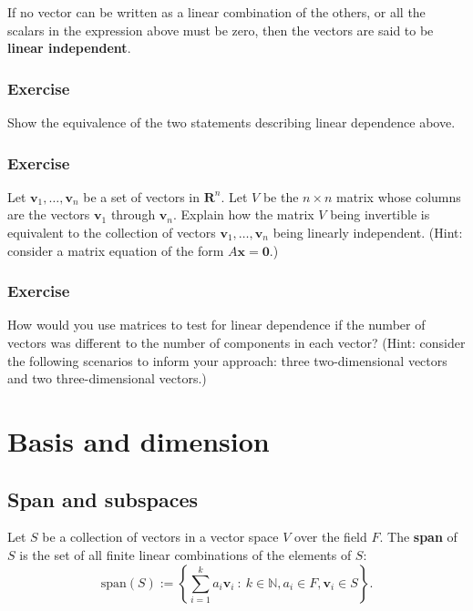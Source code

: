 \documentclass[a4paper,12pt]{amsart}
\begin{document}
    If no vector can be written as a linear combination of the others, or all the scalars in the expression above must be zero, then the vectors are said to be \textbf{linear independent}.

    \subsubsection{Exercise} Show the equivalence of the two statements describing linear dependence above.

    \subsubsection{Exercise} Let $\mathbf{v}_1, \ldots, \mathbf{v}_n$ be a set of vectors in $\mathbf{R}^n$. Let $V$ be the $n \times n$ matrix whose columns are the vectors $\mathbf{v}_1$ through $\mathbf{v}_n$. Explain how the matrix $V$ being invertible is equivalent to the collection of vectors $\mathbf{v}_1, \ldots, \mathbf{v}_n$ being linearly independent. (Hint: consider a matrix equation of the form $A\mathbf{x} = \mathbf{0}$.)

    \subsubsection{Exercise} How would you use matrices to test for linear dependence if the number of vectors was different to the number of components in each vector? (Hint: consider the following scenarios to inform your approach: three two-dimensional vectors and two three-dimensional vectors.)

    \section{Basis and dimension}

    \subsection{Span and subspaces} Let $S$ be a collection of vectors in a vector space $V$ over the field $F$. The \textbf{span} of $S$ is the set of all finite linear combinations of the elements of $S$:
    \[ \mathrm{span} (S) := \left\{ \sum_{i=1}^k a_i \mathbf{v}_i \: : \: k \in \mathbb{N}, a_i \in F, \mathbf{v}_i \in S \right \}. \]
    
\end{document}
